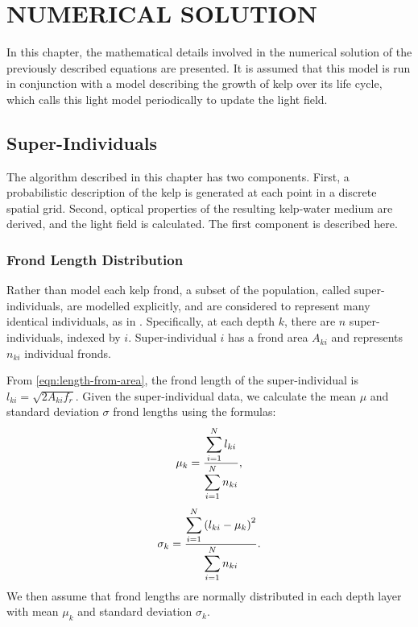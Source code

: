 \chapter{NUMERICAL SOLUTION}
\label{chap:numerical}

In this chapter, the mathematical details involved in the numerical solution of the previously described equations are presented.
It is assumed that this model is run in conjunction with a model describing the growth of kelp over its life cycle, which calls this light model periodically to update the light field.

\section{Super-Individuals}

The algorithm described in this chapter has two components.
First, a probabilistic description of the kelp is generated at each point in a discrete spatial grid.
Second, optical properties of the resulting kelp-water medium are derived, and the light field is calculated.
The first component is described here.

\subsection{Frond Length Distribution}

Rather than model each kelp frond, a subset of the population, called super-individuals, are modelled explicitly, and are considered to represent many identical individuals, as in \citep{scheffer_super-individuals_1994}.
Specifically, at each depth $k$, there are $n$ super-individuals, indexed by $i$.
Super-individual $i$ has a frond area $A_{ki}$ and represents $n_{ki}$ individual fronds.

From \eqref{eqn:length-from-area}, the frond length of the super-individual is $l_{ki} = \sqrt{2A_{ki}f_r}$.
Given the super-individual data, we calculate the mean $\mu$ and standard deviation $\sigma$ frond
lengths using the formulas:
\begin{equation}
  \mu_k = \frac{\displaystyle \sum_{i=1}^N l_{ki}}{\displaystyle \sum_{i=1}^N n_{ki}},
\end{equation}
\begin{equation}
  \sigma_k = \frac{\displaystyle \sum_{i=1}^N \left( l_{ki} - \mu_k \right)^2}{\displaystyle \sum_{i=1}^N n_{ki}}.
\end{equation}
We then assume that frond lengths are normally distributed in each depth layer
with mean $\mu_k$ and standard deviation $\sigma_k$.

